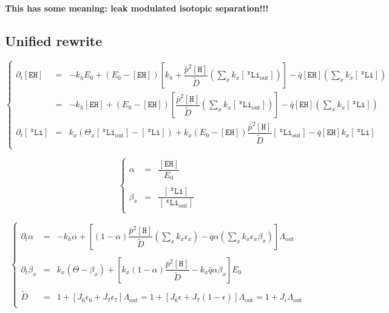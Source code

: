 \documentclass[aps,onecolumn,12pt]{revtex4}
\newcommand{\mychem}[1]{\mathtt{#1}}
\newcommand{\myconc}[1]{\left\lbrack{#1}\right\rbrack}
\newcommand{\spLi}[1]{{~^{\mychem{#1}}\mychem{Li}}}
\newcommand{\Li}[1]{\myconc{\spLi{#1}}}
\newcommand{\spLiOut}[1]{{\spLi{#1}}_{\mathrm{out}}}
\newcommand{\LiOut}[1]{\myconc{\spLiOut{#1}}}
\newcommand{\spEHin}{\mychem{EH}}
\newcommand{\EHin}{\myconc{\spEHin}}
\newcommand{\spproton}{\mychem{H}}
\newcommand{\proton}{\myconc{\spproton}}
\newcommand{\LiAll}{\Lambda}
\newcommand{\LiAllOut}{{\LiAll}_{\mathrm{out}}}
\begin{document}
\centerline{\bf This has some meaning: leak modulated isotopic separation!!!}



\subsection{Unified rewrite}

\begin{equation}
\boxed{
\left\lbrace
	\begin{array}{rcl}
		\partial_t\EHin & = & 
		-k_h E_0
		+ \left(E_0- \EHin\right)\left\lbrack k_h+ \dfrac{\bar{p}^2\proton}{\tilde{D}} \left(\sum_x k_x \LiOut{x} \right)\right] 
		- \bar{q}\EHin \left( {\sum_x k_x \Li{x}} \right)\\
		& = & 
			-k_h \EHin
		+ \left(E_0- \EHin\right)\left\lbrack \dfrac{\bar{p}^2\proton}{\tilde{D}} \left(\sum_x k_x \LiOut{x} \right)\right] 
		- \bar{q}\EHin \left( {\sum_x k_x \Li{x}} \right)\\
		\partial_t\Li{x} & = & k_x \left({\Theta}_x\LiOut{x} -\Li{x} \right) 
		 + k_x \left(E_0-\EHin\right) \dfrac{\bar{p}^2\proton}{\tilde{D}}  \LiOut{x}  -  \bar{q}\EHin k_x \Li{x}\\
	\end{array}
\right.
}
\end{equation}


\begin{equation}
\left\lbrace
\begin{array}{rcl}
	\alpha     & = & \dfrac{\EHin}{E_0}\\
	\\
	\beta_x    & = & \dfrac{\Li{x}}{\LiOut{x}}\\
\end{array}
\right.
\end{equation}

\begin{equation}
\left\lbrace
\begin{array}{rcl}
	\partial_t \alpha & = & -k_h \alpha +
	 \left[
	  (1-\alpha) \dfrac{\bar{p}^2 \proton }{\tilde{D}} \left( \sum_x k_x \epsilon_x \right)
	  - \bar{q} \alpha  \left( \sum_x k_x \epsilon_x \beta_x \right)
	  \right] \LiAllOut\\
	  \\
	  \partial_t \beta_x & = & 
	  k_x \left( \Theta - \beta_x \right)
	  + \left[
	  k_x (1-\alpha) \dfrac{\bar{p}^2\proton}{\tilde{D}}
	  -k_x\bar{q}\alpha\beta_x
	  \right] E_0
	  \\
	  \\
	  \tilde{D} & = & 1 + \left[J_6\epsilon_6+J_7\epsilon_7\right] \LiAllOut = 1 + \left[ J_6 \epsilon + J_7 \left(1-\epsilon\right) \right] \LiAllOut = 1 + J_\epsilon \LiAllOut\\
\end{array}
\right.
\end{equation}
\end{document}
